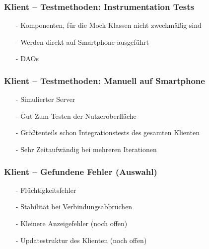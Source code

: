 \documentclass[aspectratio=1610]{beamer}
\begin{document}
\begin{frame}[plain]
        \frametitle{\textbf{Klient} -- Testmethoden: Instrumentation Tests}

        \begin{itemize}
          \item[-] Komponenten, für die Mock Klassen nicht zweckmäßig sind
          \item[-] Werden direkt auf Smartphone ausgeführt
          \item[-] DAOs
        \end{itemize}
  \end{frame}

\begin{frame}[plain]
        \frametitle{\textbf{Klient} -- Testmethoden: Manuell auf Smartphone}

        \begin{itemize}
          \item[-] Simulierter Server
          \item[-] Gut Zum Testen der Nutzeroberfläche
          \item[-] Größtenteils schon Integrationstests des gesamten Klienten
          \item[-] Sehr Zeitaufwändig bei mehreren Iterationen
        \end{itemize}
  \end{frame}

\begin{frame}[plain]
        \frametitle{\textbf{Klient} -- Gefundene Fehler (Auswahl)}

        \begin{itemize}
          \item[-] Flüchtigkeitsfehler
          \item[-] Stabilität bei Verbindungsabbrüchen
          \item[-] Kleinere Anzeigefehler (noch offen)
          \item[-] Updatestruktur des Klienten (noch offen)
        \end{itemize}
  \end{frame}
\end{document}

